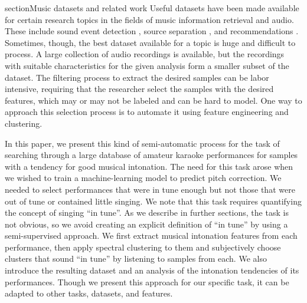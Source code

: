 section{Music datasets and related work}
Useful datasets have been made available for certain research topics in the fields of music information retrieval and audio. These include sound event detection \cite{Mesaros2018_DCASE}, source separation \cite{SiSEC17}, and recommendations \cite{bertin2011million}. Sometimes, though, the best dataset available for a topic is huge and difficult to process. A large collection of audio recordings is available, but the recordings with suitable characteristics for the given analysis form a smaller subset of the dataset. The filtering process to extract the desired samples can be labor intensive, requiring that the researcher select the samples with the desired features, which may or may not be labeled and can be hard to model. One way to approach this selection process is to automate it using feature engineering and clustering. 

In this paper, we present this kind of semi-automatic process for the task of searching through a large database of amateur karaoke performances for samples with a tendency for good musical intonation. The need for this task arose when we wished to train a machine-learning model to predict pitch correction. We needed to select performances that were in tune enough but not those that were out of tune or contained little singing. We note that this task requires quantifying the concept of singing ``in tune''. As we describe in further sections, the task is not obvious, so we avoid creating an explicit definition of ``in tune'' by using a semi-supervised approach. We first extract musical intonation features from each performance, then apply spectral clustering to them and subjectively choose clusters that sound ``in tune'' by listening to samples from each. We also introduce the resulting dataset and an analysis of the intonation tendencies of its performances. Though we present this approach for our specific task, it can be adapted to other tasks, datasets, and features.

